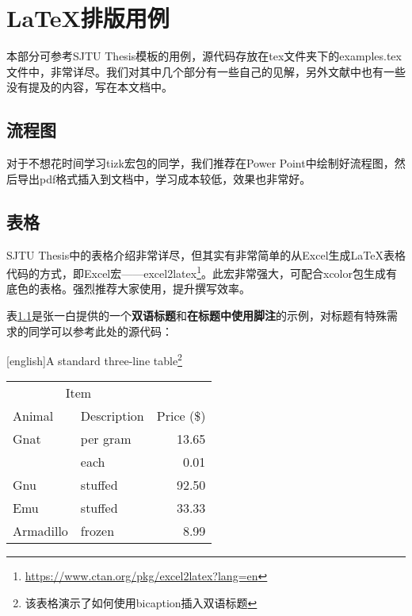 
\chapter{\LaTeX 排版用例}\label{chap:example}

本部分可参考SJTU Thesis模板\cite{SJTUThesis}的用例，源代码存放在tex文件夹下的examples.tex文件中，非常详尽。我们对其中几个部分有一些自己的见解，另外文献中也有一些没有提及的内容，写在本文档中。

\section{流程图}

对于不想花时间学习tizk宏包的同学，我们推荐在Power Point中绘制好流程图，然后导出pdf格式插入到文档中，学习成本较低，效果也非常好。

\section{表格}

SJTU Thesis中的表格介绍非常详尽，但其实有非常简单的从Excel生成\LaTeX 表格代码的方式，即Excel宏——excel2latex\footnote{\url{https://www.ctan.org/pkg/excel2latex?lang=en}}。此宏非常强大，可配合xcolor包生成有底色的表格。强烈推荐大家使用，提升撰写效率。

\begin{savenotes}

表\ref{tab:bicap}是张一白提供的一个\textbf{双语标题}和\textbf{在标题中使用脚注}的示例，对标题有特殊需求的同学可以参考此处的源代码：
\begin{table}[H]
  \centering
  [english]{A standard three-line table\footnote{该表格演示了如何使用bicaption插入双语标题}}
  \label{tab:bicap}
  \begin{tabular}{@{}llr@{}} \toprule
    \multicolumn{2}{c}{Item} \\ \cmidrule(r){1-2}
    Animal & Description & Price (\$)\\ \midrule
    Gnat & per gram & 13.65 \\
    & each & 0.01 \\
    Gnu & stuffed & 92.50 \\
    Emu & stuffed & 33.33 \\
    Armadillo & frozen & 8.99 \\ \bottomrule
  \end{tabular}
\end{table}

\end{savenotes}

